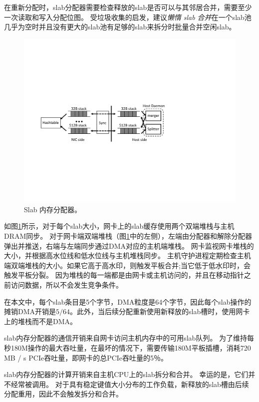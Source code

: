 在重新分配时，slab分配器需要检查释放的slab是否可以与其邻居合并，需要至少一次读取和写入分配位图。
受垃圾收集的启发，建议\textit {懒惰 slab 合并}在一个slab池几乎为空时并且没有更大的slab池有足够的slab来拆分时批量合并空闲slab。


\begin{figure}[htbp]
	\centering
	\includegraphics[width=.8\textwidth,page=1]{figure/cropped_slab.pdf}
	\caption{Slab 内存分配器。}
	\label{kvdirect:fig:slab}
	
\end{figure}

如图\ref {kvdirect:fig:slab}所示，对于每个slab大小，网卡上的slab缓存使用两个双端堆栈与主机DRAM同步。
对于网卡端双端堆栈（图\ref {kvdirect:fig:slab}中的左侧），左端由分配器和解除分配器弹出并推送，右端与左端同步通过DMA对应的​​主机端堆栈。
网卡监视网卡堆栈的大小，并根据高水位线和低水位线与主机堆栈同步。
主机守护进程定期检查主机端双端堆栈的大小。如果它高于高水印，则触发平板合并;当它低于低水印时，会触发平板分裂。
因为堆栈的每一端都是由网卡或主机访问的，并且在移动指针之前访问数据，所以不会发生竞争条件。

在本文中，每个slab条目是5个字节，DMA粒度是64个字节，因此每个slab操作的摊销DMA开销是$ 5/64 $。此外，当后续分配重新使用新释放的slab槽时，使用网卡上的堆栈而不是DMA。

\label{kvdirect:sec:slab-eval}


slab内存分配器的通信开销来自网卡访问主机内存中的可用slab队列。
为了维持每秒180M操作的最大吞吐量，在最坏的情况下，需要传输180M平板插槽，消耗720 MB / s PCIe吞吐量，即网卡的总PCIe吞吐量的5％。

slab内存分配器的计算开销来自主机CPU上的slab拆分和合并。
幸运的是，它们并不经常被调用。
对于具有稳定键值大小分布的工作负载，新释放的slab槽由后续分配重用，因此不会触发拆分和合并。

